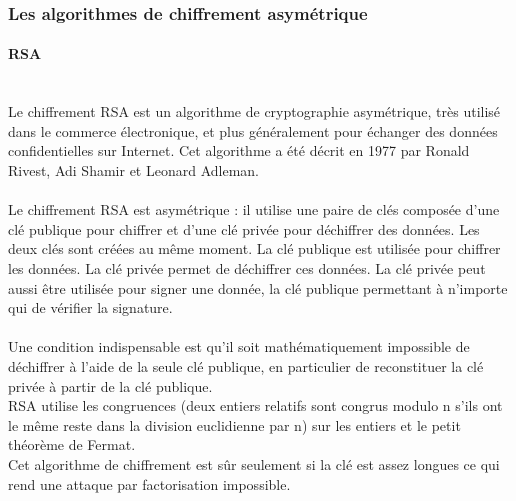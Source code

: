         \subsubsection*{Les algorithmes de chiffrement asymétrique}
            
            \paragraph*{RSA} \hspace{0pt} \\
                Le chiffrement RSA est un algorithme de cryptographie asymétrique, très utilisé dans le commerce électronique, et plus généralement pour échanger des données confidentielles sur Internet. Cet algorithme a été décrit en 1977 par Ronald Rivest, Adi Shamir et Leonard Adleman. \\ \\
                Le chiffrement RSA est asymétrique : il utilise une paire de clés composée d'une clé publique pour chiffrer et d'une clé privée pour déchiffrer des données. Les deux clés sont créées au même moment. La clé publique est utilisée pour chiffrer les données. La clé privée permet de déchiffrer ces données. La clé privée peut aussi être utilisée pour signer une donnée, la clé publique permettant à n'importe qui de vérifier la signature. \\ \\
                Une condition indispensable est qu'il soit mathématiquement impossible de déchiffrer à l'aide de la seule clé publique, en particulier de reconstituer la clé privée à partir de la clé publique. \\ 
                RSA utilise les congruences (deux entiers relatifs sont congrus modulo n s'ils ont le même reste dans la division euclidienne par n) sur les entiers et le petit théorème de Fermat. \\
                Cet algorithme de chiffrement est sûr seulement si la clé est  assez longues ce qui rend une attaque par factorisation impossible. \\ 

            \newpage

